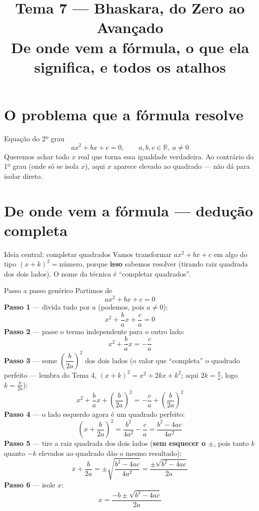\documentclass[12pt,a4paper]{article}
\title{\vspace{-1.5cm}\textbf{Tema 7 — Bhaskara, do Zero ao Avançado}\\[2pt]\large De onde vem a fórmula, o que ela significa, e todos os atalhos}
\author{}
\date{}
\begin{document}
\maketitle
\thispagestyle{empty}

\section{O problema que a fórmula resolve}

\begin{definicao}{Equação do 2º grau}
\[
ax^2+bx+c=0, \qquad a,b,c\in\mathbb{R},\ a\neq0
\]
Queremos achar todo $x$ real que torna essa igualdade verdadeira. Ao
contrário do 1º grau (onde só se isola $x$), aqui $x$ aparece elevado ao
quadrado — não dá para isolar direto.
\end{definicao}

\section{De onde vem a fórmula — dedução completa}

\begin{dica}{Ideia central: completar quadrados}
Vamos transformar $ax^2+bx+c$ em algo do tipo $(x+k)^2 = \text{número}$,
porque \textbf{isso} sabemos resolver (tirando raiz quadrada dos dois
lados). O nome da técnica é ``completar quadrados''.
\end{dica}

\begin{exemplo}{Passo a passo genérico}
Partimos de
\[
ax^2+bx+c=0
\]
\textbf{Passo 1} — divida tudo por $a$ (podemos, pois $a\neq0$):
\[
x^2+\frac{b}{a}x+\frac{c}{a}=0
\]
\textbf{Passo 2} — passe o termo independente para o outro lado:
\[
x^2+\frac{b}{a}x = -\frac{c}{a}
\]
\textbf{Passo 3} — some $\left(\dfrac{b}{2a}\right)^2$ dos dois lados (o
valor que ``completa'' o quadrado perfeito — lembra do Tema 4,
$(x+k)^2=x^2+2kx+k^2$; aqui $2k=\frac{b}{a}$, logo $k=\frac{b}{2a}$):
\[
x^2+\frac{b}{a}x+\left(\frac{b}{2a}\right)^2 = -\frac{c}{a}+\left(\frac{b}{2a}\right)^2
\]
\textbf{Passo 4} — o lado esquerdo agora é um quadrado perfeito:
\[
\left(x+\frac{b}{2a}\right)^2 = \frac{b^2}{4a^2}-\frac{c}{a} = \frac{b^2-4ac}{4a^2}
\]
\textbf{Passo 5} — tire a raiz quadrada dos dois lados (\textbf{sem
esquecer o $\pm$}, pois tanto $k$ quanto $-k$ elevados ao quadrado dão o
mesmo resultado):
\[
x+\frac{b}{2a} = \pm\sqrt{\frac{b^2-4ac}{4a^2}} = \frac{\pm\sqrt{b^2-4ac}}{2a}
\]
\textbf{Passo 6} — isole $x$:
\[
\boxed{x = \frac{-b\pm\sqrt{b^2-4ac}}{2a}}
\]
\end{exemplo}
\end{document}
